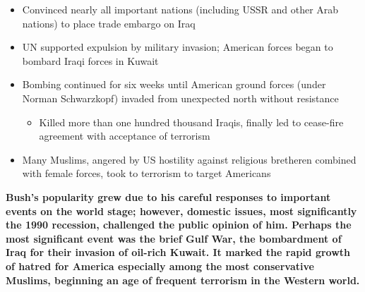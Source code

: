 \documentclass[a4paper]{article}
\begin{document}
{\begin{itemize}
\begin{itemize}
                \begin{itemize}
                    \item Convinced nearly all important nations (including USSR and other Arab nations) to place trade embargo on Iraq
                    \item UN supported expulsion by military invasion; American forces began to bombard Iraqi forces in Kuwait
                    \item Bombing continued for six weeks until American ground forces (under Norman Schwarzkopf) invaded from unexpected north without resistance
                    \begin{itemize}
                        \item Killed more than one hundred thousand Iraqis, finally led to cease-fire agreement with acceptance of terrorism
                    \end{itemize}
                    \item Many Muslims, angered by US hostility against religious bretheren combined with female forces, took to terrorism to target Americans
                \end{itemize}
            \end{itemize}
        \end{itemize}
        \textbf{Bush's popularity grew due to his careful responses to important events on the world stage; however, domestic issues, most significantly the 1990 recession, challenged the public opinion of him. Perhaps the most significant event was the brief Gulf War, the bombardment of Iraq for their invasion of oil-rich Kuwait. It marked the rapid growth of hatred for America especially among the most conservative Muslims, beginning an age of frequent terrorism in the Western world.}
    }
\end{document}
